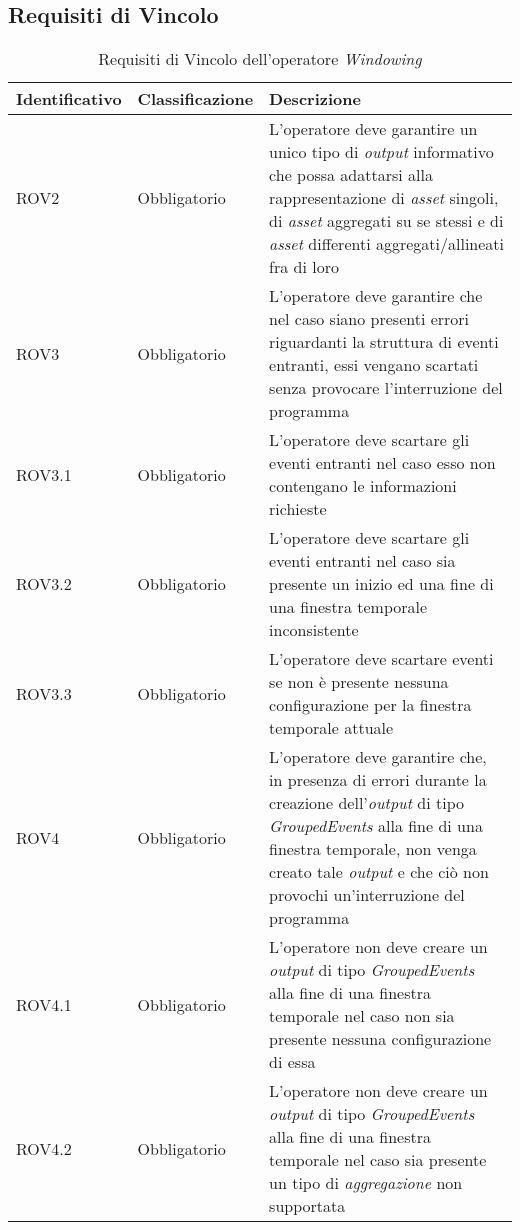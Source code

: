 \subsection{Requisiti di Vincolo}
{
\centering
\begin{longtable}{L{3cm} L{3cm} L{7.5cm}}
\caption{Requisiti di Vincolo dell'operatore \textit{Windowing}}\\
\textbf{Identificativo} &
\textbf{Classificazione}&
\textbf{Descrizione}\\
\endhead
\hline

ROV2 & Obbligatorio & L'operatore deve garantire un unico tipo di \textit{output} informativo che possa adattarsi alla rappresentazione di \textit{asset} singoli, di \textit{asset} aggregati su se stessi e di \textit{asset} differenti aggregati/allineati fra di loro \\
\hline
ROV3 & Obbligatorio & L'operatore deve garantire che nel caso siano presenti errori riguardanti la struttura di eventi entranti, essi vengano scartati senza provocare l'interruzione del programma\\
\hline
ROV3.1 & Obbligatorio & L'operatore deve scartare gli eventi entranti nel caso esso non contengano le informazioni richieste\\
\hline
ROV3.2 & Obbligatorio & L'operatore deve scartare gli eventi entranti nel caso sia presente un inizio ed una fine di una finestra temporale inconsistente\\
\hline
ROV3.3 & Obbligatorio & L'operatore deve scartare eventi se non è presente nessuna configurazione per la finestra temporale attuale\\
\hline
ROV4 & Obbligatorio & L'operatore deve garantire che, in presenza di errori durante la creazione dell'\textit{output} di tipo \textit{GroupedEvents} alla fine di una finestra temporale, non venga creato tale \textit{output} e che ciò non provochi un'interruzione del programma\\
\hline
ROV4.1 & Obbligatorio & L'operatore non deve creare un \textit{output} di tipo \textit{GroupedEvents} alla fine di una finestra temporale nel caso non sia presente nessuna configurazione di essa\\
\hline
ROV4.2 & Obbligatorio & L'operatore non deve creare un \textit{output} di tipo \textit{GroupedEvents} alla fine di una finestra temporale nel caso sia presente un tipo di \textit{aggregazione} non supportata\\
\hline
\end{longtable}
}




